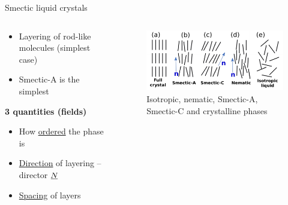 \documentclass[10pt,notes]{beamer}
\newcommand{\suf}[2]{\stackunder[0.5pt]{\stackunder[1pt]{\ensuremath{#1}}{\rule{\widthof{\ensuremath{#2}}*\real{0.9}}{.1ex}}}{}}
\newcommand{\su}[1]{\suf{#1}{#1}}
\begin{document}
\begin{frame}[fragile]{Smectic liquid crystals}
    \newrefsection
    \begin{columns}
        \begin{column}{0.49\textwidth}
            \begin{itemize}
                \setlength\itemsep{1ex}
                \item Layering of rod-like molecules \color{gray} (simplest case) \normalcolor
                \item Smectic-A is the simplest
            \end{itemize}
            \vspace{2em}
            \begin{center}
                \large \bf 3 quantities \color{gray} (fields) \normalcolor
            \end{center}
            \vspace{1ex}
            \begin{itemize}
                \setlength\itemsep{1ex}
                \item How \underline{ordered} the phase is
                \item \underline{Direction} of layering -- director $\su{N}$
                \item \underline{Spacing} of layers
            \end{itemize}
        \end{column}
        \begin{column}{0.49\textwidth}
            \begin{figure}
                \centering
                \includegraphics[width=\textwidth]{figures/phases.pdf}
                \caption{Isotropic, nematic, Smectic-A, Smectic-C and crystalline phases}
            \end{figure}
        \end{column}
    \end{columns}
\end{frame}
\end{document}
